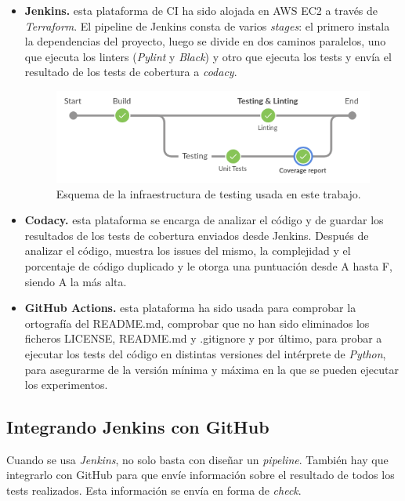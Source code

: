 \begin{itemize}
	\item \textbf{Jenkins.} esta plataforma de CI ha sido alojada en AWS EC2 a través de \textit{Terraform}. El pipeline de Jenkins consta de varios \textit{stages}: el primero instala la dependencias del proyecto, luego se divide en dos caminos paralelos, uno que ejecuta los linters (\textit{Pylint} y \textit{Black}) y otro que ejecuta los tests y envía el resultado de los tests de cobertura a \textit{codacy}.

	\begin{figure}[H]
		\includegraphics[width=.6\linewidth]{imagenes/05_Implementacion/jenkinspipeline.png}
		\centering
		\captionsetup{justification=centering}
		\caption{Esquema de la infraestructura de testing usada en este trabajo.}
		\label{fig:jenkinspipeline}
\end{figure}

	\item \textbf{Codacy.} esta plataforma se encarga de analizar el código y de guardar los resultados de los tests de cobertura enviados desde Jenkins. Después de analizar el código, muestra los issues del mismo, la complejidad y el porcentaje de código duplicado y le otorga una puntuación desde A hasta F, siendo A la más alta.
	
	\item \textbf{GitHub Actions.} esta plataforma ha sido usada para comprobar la ortografía del README.md, comprobar que no han sido eliminados los ficheros LICENSE, README.md y .gitignore y por último, para probar a ejecutar los tests del código en distintas versiones del intérprete de \textit{Python}, para asegurarme de la versión mínima y máxima en la que se pueden ejecutar los experimentos. 
\end{itemize}

\subsection{Integrando Jenkins con GitHub}

Cuando se usa \textit{Jenkins}, no solo basta con diseñar un \textit{pipeline}. También hay que integrarlo con GitHub para que envíe información sobre el resultado de todos los tests realizados. Esta información se envía en forma de \textit{check}.

